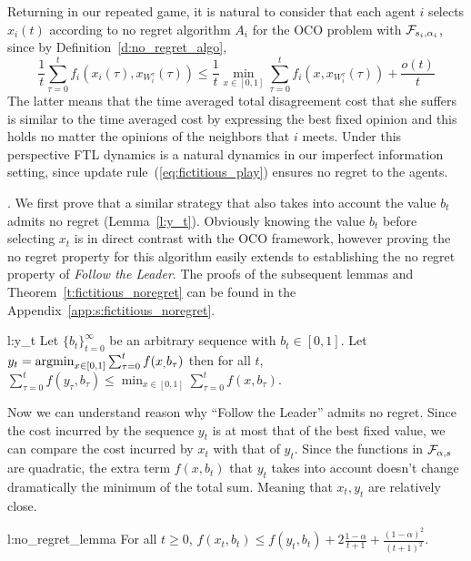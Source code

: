 Returning in our repeated game, it is natural to
consider that each agent $i$ selects $x_i(t)$ according
to no regret algorithm $A_i$ for the OCO problem with $\mathcal{F}_{s_i,\alpha_i}$,
since by Definition~\ref{d:no_regret_algo},
\[\frac{1}{t}\sum_{\tau=0}^t f_i(x_i(\tau),x_{W_i^\tau}(\tau)) \leq
\frac{1}{t}\min_{x \in [0,1]}\sum_{\tau=0}^tf_i(x,x_{W_i^\tau}(\tau)) + \frac{o(t)}{t}\]
The latter means that the time averaged total disagreement cost
that she suffers is similar to the time averaged cost by expressing the
best fixed opinion and this holds no matter the opinions of the
neighbors that $i$ meets. Under this perspective FTL dynamics 
is a natural dynamics in our imperfect information setting,
since update rule~(\ref{eq:fictitious_play}) ensures no regret to the agents.


.
We first prove that a similar strategy that also takes into
account the value $b_t$ admits no regret (Lemma~\ref{l:y_t}).
Obviously knowing the value $b_t$ before selecting $x_t$
is in direct contrast with the OCO framework, however proving
the no regret property for this algorithm easily extends to
establishing the no regret property of \emph{Follow the Leader}.
The proofs of the subsequent lemmas and
Theorem~\ref{t:fictitious_noregret} can be found in the
Appendix~\ref{app:s:fictitious_noregret}.
\begin{replemma}{l:y_t}
Let $\{b_t\}_{t=0}^\infty$ be an arbitrary sequence with $b_t \in [0,1]$.
Let $y_t = \operatorname*{argmin}_{x \in [0,1]}\sum_{\tau=0}^tf(x_,b_\tau)$
then for all $t$,
\(
\sum_{\tau=0}^t f(y_\tau,b_\tau) \leq \min_{x \in [0,1]}
\sum_{\tau = 0}^tf(x,b_\tau).
\)
\end{replemma}
Now we can understand reason why \enquote{Follow the Leader}
admits no regret. Since the cost incurred by the sequence $y_t$ is at most that
of the best fixed value, we can compare the cost incurred by $x_t$ with
that of $y_t$.  Since the functions in $\mathcal{F}_{\alpha,s}$ are quadratic,
the extra term $f(x,b_t)$ that $y_t$ takes into account doesn't change
dramatically the minimum of the total sum. Meaning that $x_t,y_t$ 
are relatively close. 
\begin{replemma}{l:no_regret_lemma}
  For all $t\geq 0$,
  \(
    f(x_t,b_t) \leq f(y_t,b_t) + 2\frac{1-\alpha}{t+1} +
    \frac{(1-\alpha)^2}{(t+1)^2}
  \).
\end{replemma}
